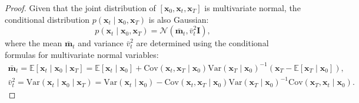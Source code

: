 \begin{proof}
Given that the joint distribution of $[\mathbf{x}_0, \mathbf{x}_t, \mathbf{x}_T]$ is multivariate normal, the conditional distribution $p(\mathbf{x}_t \mid \mathbf{x}_0, \mathbf{x}_T)$ is also Gaussian:
\begin{equation}
    p(\mathbf{x}_t\mid \mathbf{x}_0, \mathbf{x}_T) = \mathcal{N}(\bar{\mathbf{m}}_t, \bar{v}_t^2 \bm{I}),
\end{equation}
where the mean $\bar{\mathbf{m}}_t$ and variance $\bar{v}_t^2$ are determined using the conditional formulas for multivariate normal variables:
\begin{equation}
\begin{split}
\bar{\mathbf{m}}_t 
=  \mathbb{E}[\mathbf{x}_t\mid \mathbf{x}_0 \mid \mathbf{x}_T]
=\mathbb{E}[\mathbf{x}_t\mid \mathbf{x}_0]+\mathrm{Cov}(\mathbf{x}_t,\mathbf{x}_T\mid \mathbf{x}_0)\mathrm{Var}(\mathbf{x}_T\mid \mathbf{x}_0)^{-1}(\mathbf{x}_T-\mathbb{E}[\mathbf{x}_T\mid \mathbf{x}_0]),\\
\bar{v}_t^2
= \mathrm{Var}(\mathbf{x}_t\mid \mathbf{x}_0 \mid \mathbf{x}_T)
=\mathrm{Var}(\mathbf{x}_t\mid \mathbf{x}_0)-\mathrm{Cov}(\mathbf{x}_t,\mathbf{x}_T\mid \mathbf{x}_0)\mathrm{Var}(\mathbf{x}_T\mid \mathbf{x}_0)^{-1}\mathrm{Cov}(\mathbf{x}_T,\mathbf{x}_t\mid \mathbf{x}_0).
\end{split}
\label{eq:OUB-m-v}
\end{equation}


\end{proof}
